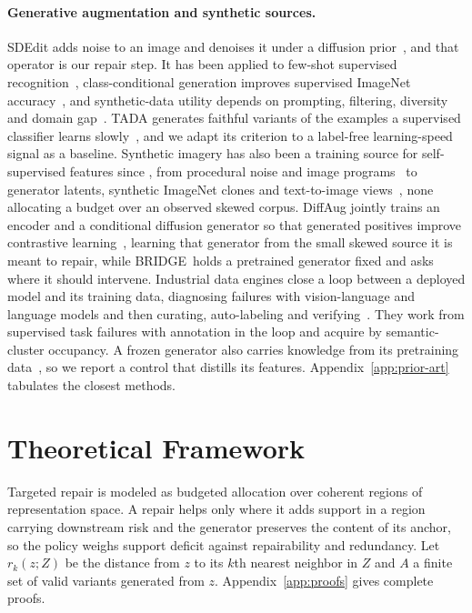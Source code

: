 \documentclass{article}
\newcommand{\method}{BRIDGE}
\begin{document}
\paragraph{Generative augmentation and synthetic sources.}
SDEdit adds noise to an image and denoises it under a diffusion prior~\citep{ho2020denoising,rombach2022highresolution,meng2022sdedit}, and that operator is our repair step. It has been applied to few-shot supervised recognition~\citep{trabucco2023effective}, class-conditional generation improves supervised ImageNet accuracy~\citep{azizi2023synthetic}, and synthetic-data utility depends on prompting, filtering, diversity and domain gap~\citep{he2023synthetic,fan2024scaling}. TADA generates faithful variants of the examples a supervised classifier learns slowly~\citep{nguyen2026tada}, and we adapt its criterion to a label-free learning-speed signal as a baseline. Synthetic imagery has also been a training source for self-supervised features since \citet{ren2018crossdomain}, from procedural noise and image programs~\citep{baradad2021noise,baradad2022procedural} to generator latents, synthetic ImageNet clones and text-to-image views~\citep{jahanian2022generative,sariyildiz2023fake,tian2023stablerep}, none allocating a budget over an observed skewed corpus. DiffAug jointly trains an encoder and a conditional diffusion generator so that generated positives improve contrastive learning~\citep{zang2024diffaug}, learning that generator from the small skewed source it is meant to repair, while \method\ holds a pretrained generator fixed and asks where it should intervene. Industrial data engines close a loop between a deployed model and its training data, diagnosing failures with vision-language and language models and then curating, auto-labeling and verifying~\citep{liang2024aide,worker2022omniverse}. They work from supervised task failures with annotation in the loop and acquire by semantic-cluster occupancy. A frozen generator also carries knowledge from its pretraining data~\citep{li2023dreamteacher,tang2023dift,yu2025repa}, so we report a control that distills its features. Appendix~\ref{app:prior-art} tabulates the closest methods.

\section{Theoretical Framework}
\label{sec:theory}
Targeted repair is modeled as budgeted allocation over coherent regions of representation space. A repair helps only where it adds support in a region carrying downstream risk and the generator preserves the content of its anchor, so the policy weighs support deficit against repairability and redundancy. Let $r_k(z;Z)$ be the distance from $z$ to its $k$th nearest neighbor in $Z$ and $A$ a finite set of valid variants generated from $z$. Appendix~\ref{app:proofs} gives complete proofs.
\end{document}
